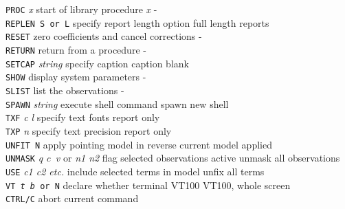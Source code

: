 {\begin{small}
\begin{tabs}
{\tt PROC} {\it x} \> start of library procedure {\it x} \> - \\
{\tt REPLEN S {\rm or} L} \> specify report length option \>
                      full length reports \\
{\tt RESET} \> zero coefficients and cancel corrections \> - \\
{\tt RETURN} \> return from a procedure \> - \\
{\tt SETCAP} {\it string} \> specify caption \> caption blank \\
{\tt SHOW} \> display system parameters \> - \\
{\tt SLIST} \> list the observations \> - \\
{\tt SPAWN} {\it string} \> execute shell command \> spawn new shell \\
{\tt TXF} {\it c l} \> specify text fonts \> report only \\
{\tt TXP} {\it n} \> specify text precision \> report only \\
{\tt UNFIT N} \> apply pointing model in reverse \>
                        current model applied \\
{\tt UNMASK} {\it q c\, v} or {\it n1 n2} \>
                        flag selected observations active \>
                        unmask all observations \\
{\tt USE} {\it c1 c2 etc.} \> include selected terms in model \>
                                unfix all terms \\
{\tt VT {\it t b} {\rm or} N} \> declare whether terminal VT100 \>
                        VT100, whole screen \\
{\tt CTRL/C} \> abort current command \>
\end{tabs}
\end{small}
}

